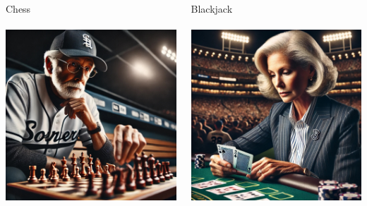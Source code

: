 \documentclass{beamer}
\begin{document}
\begin{frame}
  \begin{columns}
    \begin{column}{0.5\textwidth}
      \centering \LARGE Chess\\
      ~\\
      \includegraphics[width = \textwidth]{images/chess.jpeg}
    \end{column}
    \begin{column}{0.5\textwidth}
      \centering \LARGE Blackjack\\
      ~\\
      \includegraphics[width = \textwidth]{images/blackjack.jpeg}
    \end{column}
  \end{columns}
\end{frame}
\end{document}
